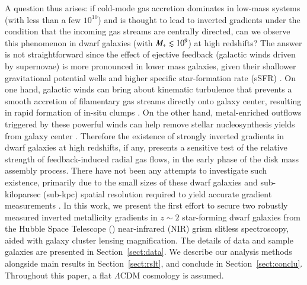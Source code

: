 A question thus arises: if cold-mode gas accretion dominates in low-mass systems (with \Mstar less than a few
$10^{10}$\Msun) and is thought to lead to inverted gradients under the condition that the incoming gas streams 
are centrally directed, can we observe this phenomenon in dwarf galaxies (with $M_\ast\lesssim10^9$) at high 
redshifts?
The answer is not straightforward since the effect of ejective feedback (\eg galactic winds driven by supernovae) is more
pronounced in lower mass galaxies, given their shallower gravitational potential wells and higher specific
star-formation rate (sSFR) \citep[see \eg][]{GalaxiesonFIREFe:2014dn,2014Natur.509..177V}.
On one hand, galactic winds can bring about kinematic turbulence that prevents a smooth accretion of 
filamentary gas streams directly onto galaxy center, resulting in rapid formation of in-situ clumps 
\citep{Dekel:2009bn}.
On the other hand, metal-enriched outflows triggered by these powerful winds can help remove stellar nucleosynthesis yields from
galaxy center \citep{Tremonti:2004ed,Erb:2006kn}.
Therefore the existence of strongly inverted gradients in dwarf galaxies at high redshifts, if any, presents a sensitive test of 
the relative strength of feedback-induced radial gas flows, in the early phase of the disk mass assembly process.
There have not been any attempts to investigate such existence, primarily due to the small sizes of these 
dwarf galaxies and sub-kiloparsec (sub-kpc) spatial resolution required to yield accurate gradient 
measurements \citep{2013ApJ...767..106Y}.
In this work, we present the first effort to secure two robustly measured inverted metallicity gradients in $z\sim2$ star-forming
dwarf galaxies from the Hubble Space Telescope (\hst) near-infrared (NIR) grism slitless spectroscopy, aided 
with galaxy cluster lensing magnification.
The details of data and sample galaxies are presented in Section~\ref{sect:data}. We describe our analysis methods alongside main 
results in Section~\ref{sect:rslt}, and conclude in Section~\ref{sect:conclu}.
Throughout this paper, a flat $\Lambda$CDM cosmology is assumed.



